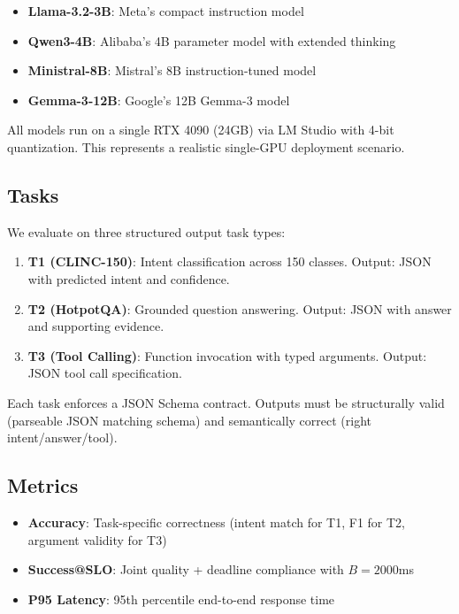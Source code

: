 \documentclass[11pt]{article}
\begin{document}
\begin{itemize}[leftmargin=12pt]
    \item \textbf{Llama-3.2-3B}: Meta's compact instruction model
    \item \textbf{Qwen3-4B}: Alibaba's 4B parameter model with extended thinking
    \item \textbf{Ministral-8B}: Mistral's 8B instruction-tuned model
    \item \textbf{Gemma-3-12B}: Google's 12B Gemma-3 model
\end{itemize}

All models run on a single RTX 4090 (24GB) via LM Studio with 4-bit quantization.
This represents a realistic single-GPU deployment scenario.

\subsection{Tasks}

We evaluate on three structured output task types:

\begin{enumerate}[leftmargin=12pt]
    \item \textbf{T1 (CLINC-150)}: Intent classification across 150 classes. Output: JSON with predicted intent and confidence.
    \item \textbf{T2 (HotpotQA)}: Grounded question answering. Output: JSON with answer and supporting evidence.
    \item \textbf{T3 (Tool Calling)}: Function invocation with typed arguments. Output: JSON tool call specification.
\end{enumerate}

Each task enforces a JSON Schema contract.
Outputs must be structurally valid (parseable JSON matching schema) and semantically correct (right intent/answer/tool).

\subsection{Metrics}

\begin{itemize}[leftmargin=12pt]
    \item \textbf{Accuracy}: Task-specific correctness (intent match for T1, F1 for T2, argument validity for T3)
    \item \textbf{Success@SLO}: Joint quality + deadline compliance with $B = 2000$ms
    \item \textbf{P95 Latency}: 95th percentile end-to-end response time
\end{itemize}
\end{document}
